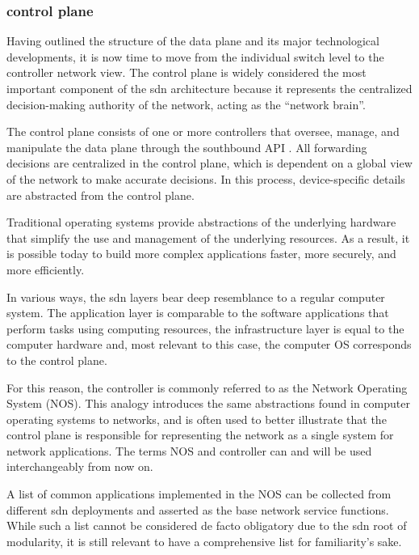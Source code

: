    
\subsubsection{control plane} %

Having outlined the structure of the data plane and its major technological developments, it is now time to move from the individual switch level to the controller network view. The control plane is widely considered the most important component of the \gls{sdn} architecture\cite{xia_survey_2015} because it represents the centralized decision-making authority of the network, acting as the “network brain”\cite{kreutz_software-defined_2015}.

The control plane consists of one or more controllers that oversee, manage, and manipulate the data plane through the southbound API\cite{kreutz_software-defined_2015} . All forwarding decisions are centralized in the control plane, which is dependent on a global view of the network to make accurate decisions. In this process, device-specific details are abstracted from the control plane. \cite{latif_comprehensive_2020}

Traditional operating systems provide abstractions of the underlying hardware that simplify the use and management of the underlying resources. As a result, it is possible today to build more complex applications faster, more securely, and more efficiently. \cite{kreutz_software-defined_2015}

In various ways, the \gls{sdn} layers bear deep resemblance to a regular computer system. The application layer is comparable to the software applications that perform tasks using computing resources, the infrastructure layer is equal to the computer hardware and, most relevant to this case, the computer OS corresponds to the control plane. \cite{thyagaturu_software_2016}

For this reason, the controller is commonly referred to as the Network Operating System (NOS). This analogy introduces the same abstractions found in computer operating systems to networks\cite{kreutz_software-defined_2015}, and is often used to better illustrate that the control plane is responsible for representing the network as a single system for network applications\cite{nunes_survey_2014}. The terms NOS and controller can and will be used interchangeably from now on.

A list of common applications implemented in the NOS can be collected from different \gls{sdn} deployments and asserted as the base network service functions\cite{kreutz_software-defined_2015}. While such a list cannot be considered de facto obligatory due to the \gls{sdn} root of modularity, it is still relevant to have a comprehensive list for familiarity's sake.


